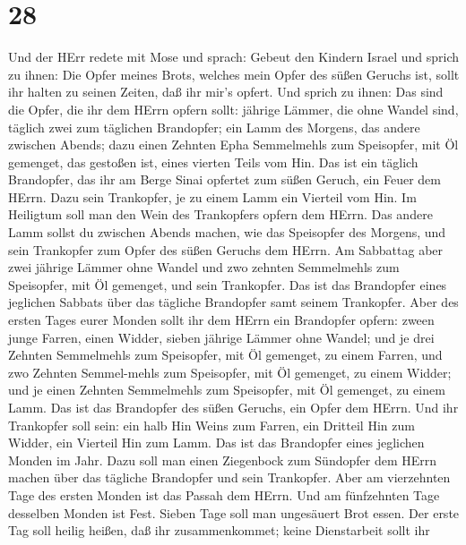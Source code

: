 \hypertarget{section-27}{%
\section{28}\label{section-27}}

 Und der HErr redete mit Mose und sprach: 
Gebeut den Kindern Israel und sprich zu ihnen: Die Opfer meines Brots,
welches mein Opfer des süßen Geruchs ist, sollt ihr halten zu seinen
Zeiten, daß ihr mir's opfert.  Und sprich zu ihnen: Das sind
die Opfer, die ihr dem HErrn opfern sollt: jährige Lämmer, die ohne
Wandel sind, täglich zwei zum täglichen Brandopfer;  ein
Lamm des Morgens, das andere zwischen Abends;  dazu einen
Zehnten Epha Semmelmehls zum Speisopfer, mit Öl gemenget, das gestoßen
ist, eines vierten Teils vom Hin.  Das ist ein täglich
Brandopfer, das ihr am Berge Sinai opfertet zum süßen Geruch, ein Feuer
dem HErrn.  Dazu sein Trankopfer, je zu einem Lamm ein
Vierteil vom Hin. Im Heiligtum soll man den Wein des Trankopfers opfern
dem HErrn.  Das andere Lamm sollst du zwischen Abends
machen, wie das Speisopfer des Morgens, und sein Trankopfer zum Opfer
des süßen Geruchs dem HErrn.  Am Sabbattag aber zwei jährige
Lämmer ohne Wandel und zwo zehnten Semmelmehls zum Speisopfer, mit Öl
gemenget, und sein Trankopfer.  Das ist das Brandopfer
eines jeglichen Sabbats über das tägliche Brandopfer samt seinem
Trankopfer.  Aber des ersten Tages eurer Monden sollt ihr
dem HErrn ein Brandopfer opfern: zween junge Farren, einen Widder,
sieben jährige Lämmer ohne Wandel;  und je drei Zehnten
Semmelmehls zum Speisopfer, mit Öl gemenget, zu einem Farren, und zwo
Zehnten Semmel-mehls zum Speisopfer, mit Öl gemenget, zu einem Widder;
 und je einen Zehnten Semmelmehls zum Speisopfer, mit Öl
gemenget, zu einem Lamm. Das ist das Brandopfer des süßen Geruchs, ein
Opfer dem HErrn.  Und ihr Trankopfer soll sein: ein halb
Hin Weins zum Farren, ein Dritteil Hin zum Widder, ein Vierteil Hin zum
Lamm. Das ist das Brandopfer eines jeglichen Monden im Jahr.
 Dazu soll man einen Ziegenbock zum Sündopfer dem HErrn
machen über das tägliche Brandopfer und sein Trankopfer. 
Aber am vierzehnten Tage des ersten Monden ist das Passah dem HErrn.
 Und am fünfzehnten Tage desselben Monden ist Fest. Sieben
Tage soll man ungesäuert Brot essen.  Der erste Tag soll
heilig heißen, daß ihr zusammenkommet; keine Dienstarbeit sollt ihr
